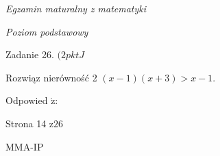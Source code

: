 \documentclass[a4paper,12pt]{article}
\begin{document}
{\it Egzamin maturalny z matematyki}

{\it Poziom podstawowy}

Zadanie 26. $(2pktJ$

Rozwiąz nierówność 2 $(x-1)(x+3)>x-1.$

Odpowied $\acute{\mathrm{z}}$:

Strona 14 $\mathrm{z}26$

MMA-IP
\end{document}
